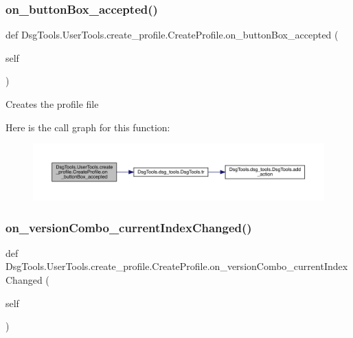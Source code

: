 \subsubsection{\texorpdfstring{on\+\_\+button\+Box\+\_\+accepted()}{on\_buttonBox\_accepted()}}
{\footnotesize\ttfamily def Dsg\+Tools.\+User\+Tools.\+create\+\_\+profile.\+Create\+Profile.\+on\+\_\+button\+Box\+\_\+accepted (\begin{DoxyParamCaption}\item[{}]{self }\end{DoxyParamCaption})}

\begin{DoxyVerb}Creates the profile file
\end{DoxyVerb}
 Here is the call graph for this function\+:
\nopagebreak
\begin{figure}[H]
\begin{center}
\leavevmode
\includegraphics[width=350pt]{class_dsg_tools_1_1_user_tools_1_1create__profile_1_1_create_profile_a11888e6ef97f1c8acf95e216cb19c28d_cgraph}
\end{center}
\end{figure}
\mbox{\label{class_dsg_tools_1_1_user_tools_1_1create__profile_1_1_create_profile_a79a377d083c06fe91ae4b38014d14cba}} 
\subsubsection{\texorpdfstring{on\+\_\+version\+Combo\+\_\+current\+Index\+Changed()}{on\_versionCombo\_currentIndexChanged()}}
{\footnotesize\ttfamily def Dsg\+Tools.\+User\+Tools.\+create\+\_\+profile.\+Create\+Profile.\+on\+\_\+version\+Combo\+\_\+current\+Index\+Changed (\begin{DoxyParamCaption}\item[{}]{self }\end{DoxyParamCaption})}

